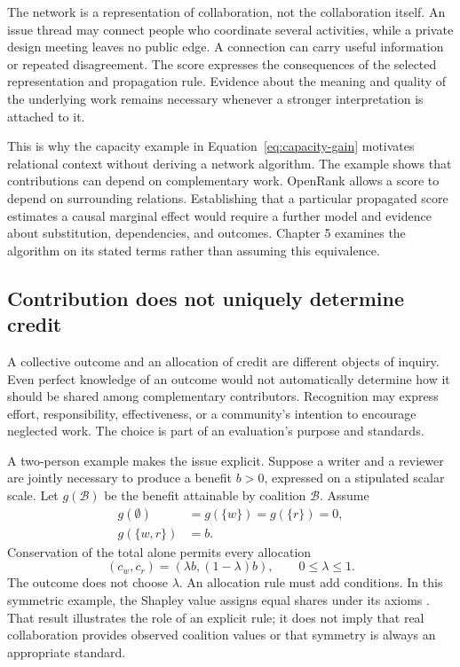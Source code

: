 The network is a representation of collaboration, not the collaboration itself. An issue thread may connect people who coordinate several activities, while a private design meeting leaves no public edge. A connection can carry useful information or repeated disagreement. The score expresses the consequences of the selected representation and propagation rule. Evidence about the meaning and quality of the underlying work remains necessary whenever a stronger interpretation is attached to it.

This is why the capacity example in Equation~\ref{eq:capacity-gain} motivates relational context without deriving a network algorithm. The example shows that contributions can depend on complementary work. OpenRank allows a score to depend on surrounding relations. Establishing that a particular propagated score estimates a causal marginal effect would require a further model and evidence about substitution, dependencies, and outcomes. Chapter 5 examines the algorithm on its stated terms rather than assuming this equivalence.

\subsection{Contribution does not uniquely determine credit}
A collective outcome and an allocation of credit are different objects of inquiry. Even perfect knowledge of an outcome would not automatically determine how it should be shared among complementary contributors. Recognition may express effort, responsibility, effectiveness, or a community's intention to encourage neglected work. The choice is part of an evaluation's purpose and standards.

A two-person example makes the issue explicit. Suppose a writer and a reviewer are jointly necessary to produce a benefit \(b>0\), expressed on a stipulated scalar scale. Let \(g(\mathcal B)\) be the benefit attainable by coalition \(\mathcal B\). Assume
\begin{equation}
\begin{split}
g(\emptyset)&=g(\{w\})=g(\{r\})=0,\\
g(\{w,r\})&=b.
\end{split}
\label{eq:joint-benefit}
\end{equation}
Conservation of the total alone permits every allocation
\begin{equation}
(c_w,c_r)=(\lambda b,(1-\lambda)b),\qquad 0\leq\lambda\leq1.
\label{eq:credit-allocation}
\end{equation}
The outcome does not choose \(\lambda\). An allocation rule must add conditions. In this symmetric example, the Shapley value assigns equal shares under its axioms \citep{shapley1953}. That result illustrates the role of an explicit rule; it does not imply that real collaboration provides observed coalition values or that symmetry is always an appropriate standard.

